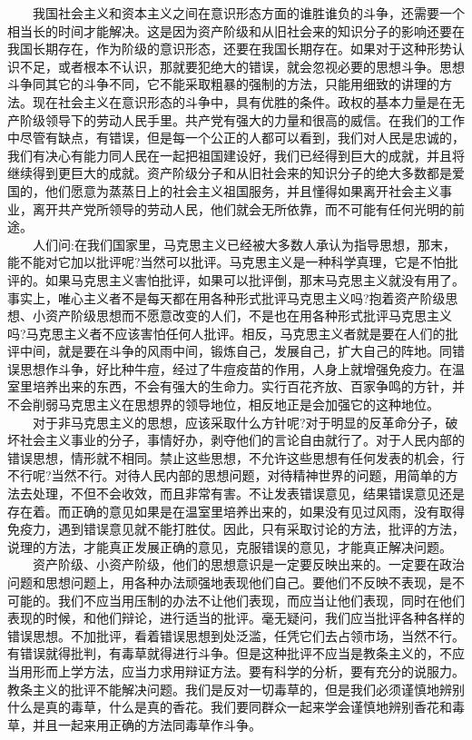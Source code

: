 \documentclass[cn,11pt,chinese]{elegantbook}
\begin{document}
　　我国社会主义和资本主义之间在意识形态方面的谁胜谁负的斗争，还需要一个相当长的时间才能解决。这是因为资产阶级和从旧社会来的知识分子的影响还要在我国长期存在，作为阶级的意识形态，还要在我国长期存在。如果对于这种形势认识不足，或者根本不认识，那就要犯绝大的错误，就会忽视必要的思想斗争。思想斗争同其它的斗争不同，它不能采取粗暴的强制的方法，只能用细致的讲理的方法。现在社会主义在意识形态的斗争中，具有优胜的条件。政权的基本力量是在无产阶级领导下的劳动人民手里。共产党有强大的力量和很高的威信。在我们的工作中尽管有缺点，有错误，但是每一个公正的人都可以看到，我们对人民是忠诚的，我们有决心有能力同人民在一起把祖国建设好，我们已经得到巨大的成就，并且将继续得到更巨大的成就。资产阶级分子和从旧社会来的知识分子的绝大多数都是爱国的，他们愿意为蒸蒸日上的社会主义祖国服务，并且懂得如果离开社会主义事业，离开共产党所领导的劳动人民，他们就会无所依靠，而不可能有任何光明的前途。\\
　　人们问:在我们国家里，马克思主义已经被大多数人承认为指导思想，那末，能不能对它加以批评呢?当然可以批评。马克思主义是一种科学真理，它是不怕批评的。如果马克思主义害怕批评，如果可以批评倒，那末马克思主义就没有用了。事实上，唯心主义者不是每天都在用各种形式批评马克思主义吗?抱着资产阶级思想、小资产阶级思想而不愿意改变的人们，不是也在用各种形式批评马克思主义吗?马克思主义者不应该害怕任何人批评。相反，马克思主义者就是要在人们的批评中间，就是要在斗争的风雨中间，锻炼自己，发展自己，扩大自己的阵地。同错误思想作斗争，好比种牛痘，经过了牛痘疫苗的作用，人身上就增强免疫力。在温室里培养出来的东西，不会有强大的生命力。实行百花齐放、百家争鸣的方针，并不会削弱马克思主义在思想界的领导地位，相反地正是会加强它的这种地位。\\
　　对于非马克思主义的思想，应该采取什么方针呢?对于明显的反革命分子，破坏社会主义事业的分子，事情好办，剥夺他们的言论自由就行了。对于人民内部的错误思想，情形就不相同。禁止这些思想，不允许这些思想有任何发表的机会，行不行呢?当然不行。对待人民内部的思想问题，对待精神世界的问题，用简单的方法去处理，不但不会收效，而且非常有害。不让发表错误意见，结果错误意见还是存在着。而正确的意见如果是在温室里培养出来的，如果没有见过风雨，没有取得免疫力，遇到错误意见就不能打胜仗。因此，只有采取讨论的方法，批评的方法，说理的方法，才能真正发展正确的意见，克服错误的意见，才能真正解决问题。\\
　　资产阶级、小资产阶级，他们的思想意识是一定要反映出来的。一定要在政治问题和思想问题上，用各种办法顽强地表现他们自己。要他们不反映不表现，是不可能的。我们不应当用压制的办法不让他们表现，而应当让他们表现，同时在他们表现的时候，和他们辩论，进行适当的批评。毫无疑问，我们应当批评各种各样的错误思想。不加批评，看着错误思想到处泛滥，任凭它们去占领市场，当然不行。有错误就得批判，有毒草就得进行斗争。但是这种批评不应当是教条主义的，不应当用形而上学方法，应当力求用辩证方法。要有科学的分析，要有充分的说服力。教条主义的批评不能解决问题。我们是反对一切毒草的，但是我们必须谨慎地辨别什么是真的毒草，什么是真的香花。我们要同群众一起来学会谨慎地辨别香花和毒草，并且一起来用正确的方法同毒草作斗争。\\
\end{document}
